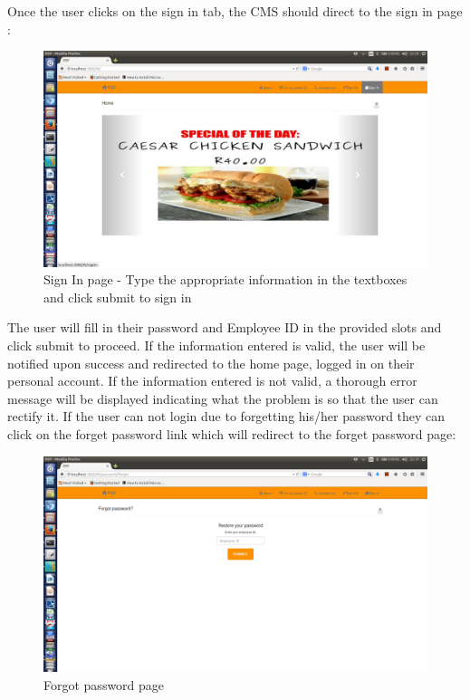 \documentclass[a4paper,12pt]{article}
\begin{document}
Once the user clicks on the sign in tab, the CMS should direct to the sign in page :

\begin{figure}[H]
  \centering
    \includegraphics[width=1.0\textwidth]{screenshots/signIn.png}
    \caption{Sign In page - Type the appropriate information in the textboxes and click submit to sign in} 
\end{figure}
  
The user will fill in their password and Employee ID in the provided slots and click submit to proceed. If the information entered is valid, the user will be notified upon success and redirected to the home page, logged in on their personal account. If the information entered is not valid, a thorough error message will be displayed indicating what the problem is so that the user can rectify it.
If the user can not login due to forgetting his/her password they can click on the forget password link which will redirect to the forget password page:
 
\begin{figure}[H]
  \centering
    \includegraphics[width=1.0\textwidth]{screenshots/ForgotPass.png}
    \caption{Forgot password page} 
\end{figure}
\end{document}
